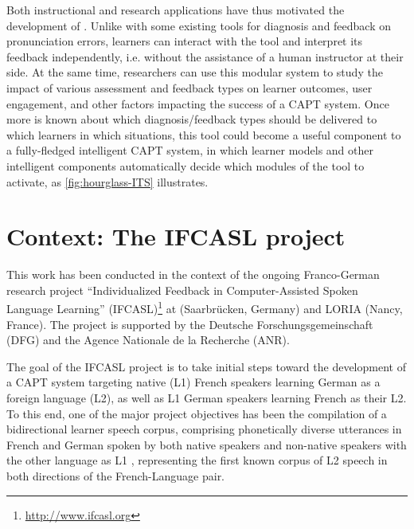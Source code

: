 Both instructional and research applications have thus motivated the development of .
Unlike with some existing tools for diagnosis and feedback on pronunciation errors, learners can interact with the tool and interpret its feedback independently, i.e. without the assistance of a human instructor at their side.
At the same time, researchers can use this modular system to study the impact of various assessment and feedback types on learner outcomes, user engagement, and other factors impacting the success of a CAPT system. 
%
Once more is known about which diagnosis/feedback types should be delivered to which learners in which situations, this tool could become a useful component to a fully-fledged intelligent CAPT system, in which learner models and other intelligent components automatically decide which modules of the tool to activate, as \cref{fig:hourglass-ITS} illustrates.




\section{Context: The IFCASL project}
\label{sec:intro:ifcasl}

This work has been conducted in the context of the ongoing Franco-German research project ``Individualized Feedback in Computer-Assisted Spoken Language Learning'' (IFCASL)\footnote{\url{http://www.ifcasl.org}} at 
\thesisUniversity
(Saarbrücken, Germany) and LORIA (Nancy, France). 
The project is supported by the Deutsche Forschungsgemeinschaft (DFG) and the Agence Nationale de la Recherche (ANR).

The goal of the IFCASL project is to take initial steps toward the development of a CAPT system targeting
native (L1) French speakers learning German as a foreign language (L2), 
as well as
L1 German speakers learning French as their L2. To this end, one of the major project objectives has been the compilation of a bidirectional learner speech corpus, comprising phonetically diverse utterances in French and German spoken by both native speakers and non-native speakers with the other language as L1 \citep{Fauth2014,Trouvain2013}, representing the first known corpus of L2 speech in both directions of the French-Language pair.

